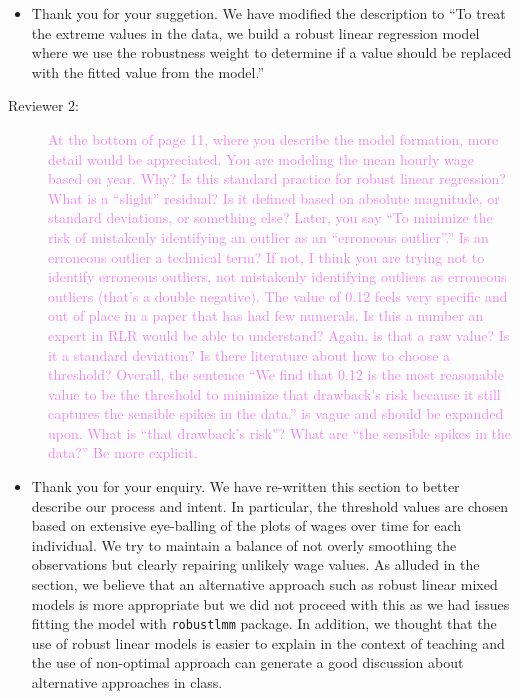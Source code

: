 \documentclass[12pt,a4paper,]{article}
\providecommand{\tightlist}{%
  \setlength{\itemsep}{0pt}\setlength{\parskip}{0pt}}
\begin{document}
\begin{itemize}
\tightlist
\item
  Thank you for your suggetion. We have modified the description to \enquote{To treat the extreme values in the data, we build a robust linear regression model where we use the robustness weight to determine if a value should be replaced with the fitted value from the model.}
\end{itemize}

\begin{description}
\item[Reviewer 2:]\textcolor{violet}{
At the bottom of page 11, where you describe the model formation, more detail would be appreciated. You are modeling the mean hourly wage based on year. Why? Is this standard practice for robust linear regression? What is a “slight” residual? Is it defined based on absolute magnitude, or standard deviations, or something else? Later, you say “To minimize the risk of mistakenly identifying an outlier as an “erroneous outlier”.” Is an erroneous outlier a technical term? If not, I think you are trying not to identify erroneous outliers, not mistakenly identifying outliers as erroneous outliers (that’s a double negative). The value of 0.12 feels very specific and out of place in a paper that has had few numerals. Is this a number an expert in RLR would be able to understand? Again, is that a raw value? Is it a standard deviation? Is there literature about how to choose a threshold? Overall, the sentence “We find that 0.12 is the most reasonable value to be the threshold to minimize that drawback’s risk because it still captures the sensible spikes in the data.” is vague and should be expanded upon. What is “that drawback’s risk”? What are “the sensible spikes in the data?” Be more explicit.}
\end{description}

\begin{itemize}
\tightlist
\item
  Thank you for your enquiry. We have re-written this section to better describe our process and intent. In particular, the threshold values are chosen based on extensive eye-balling of the plots of wages over time for each individual. We try to maintain a balance of not overly smoothing the observations but clearly repairing unlikely wage values. As alluded in the section, we believe that an alternative approach such as robust linear mixed models is more appropriate but we did not proceed with this as we had issues fitting the model with \texttt{robustlmm} package. In addition, we thought that the use of robust linear models is easier to explain in the context of teaching and the use of non-optimal approach can generate a good discussion about alternative approaches in class.
\end{itemize}
\end{document}
